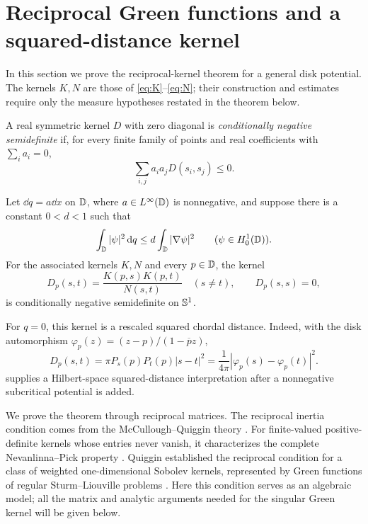 \section{Reciprocal Green functions and a squared-distance kernel}\label{sec:reciprocal}

In this section we prove the reciprocal-kernel theorem for a general disk potential. The kernels $K,N$ are those of \eqref{eq:K}--\eqref{eq:N}; their construction and estimates require only the measure hypotheses restated in the theorem below.

A real symmetric kernel $D$ with zero diagonal is \emph{conditionally negative semidefinite} if, for every finite family of points and real coefficients with $\sum_i a_i=0$,
\[
\sum_{i,j}a_i a_jD(s_i,s_j)\le0.
\]

\begin{theorem}\label{thm:negative-kernel}
Let $\dd q=a\dd x$ on $\mathbb D$, where $a\in L^\infty(\mathbb D)$ is nonnegative, and suppose there is a constant $0<d<1$ such that
\[
\int_\mathbb D|\psi|^2\,\mathrm d q\le d\int_\mathbb D|\nabla\psi|^2
\qquad(\psi\in H^1_0(\mathbb D)).
\]
For the associated kernels $K,N$ and every $p\in\mathbb D$, the kernel
\begin{equation}\label{eq:D}
D_p(s,t)=\frac{K(p,s)K(p,t)}{N(s,t)}\quad(s\ne t),
\qquad D_p(s,s)=0,
\end{equation}
is conditionally negative semidefinite on $\mathbb S^1$.
\end{theorem}

\begin{remark}\label{rem:zero-potential}
For $q=0$, this kernel is a rescaled squared chordal distance. Indeed, with the disk automorphism $\varphi_p(z)=(z-p)/(1-\overline pz)$,
\[
D_p(s,t)=\pi P_s(p)P_t(p)|s-t|^2
=\frac1{4\pi}|\varphi_p(s)-\varphi_p(t)|^2.
\]
 supplies a Hilbert-space squared-distance interpretation after a nonnegative subcritical potential is added.
\end{remark}

We prove the theorem through reciprocal matrices. The reciprocal inertia condition comes from the McCullough--Quiggin theory \cite{McCullough1994,Quiggin1994}. For finite-valued positive-definite kernels whose entries never vanish, it characterizes the complete Nevanlinna--Pick property \cite[Corollary~1.12]{AglerMcCarthy2000}. Quiggin established the reciprocal condition for a class of weighted one-dimensional Sobolev kernels, represented by Green functions of regular Sturm--Liouville problems \cite[Section~2.2, Corollary~2.2.2 and Theorem~2.2.3]{Quiggin1994}. Here this condition serves as an algebraic model; all the matrix and analytic arguments needed for the singular Green kernel will be given below.


